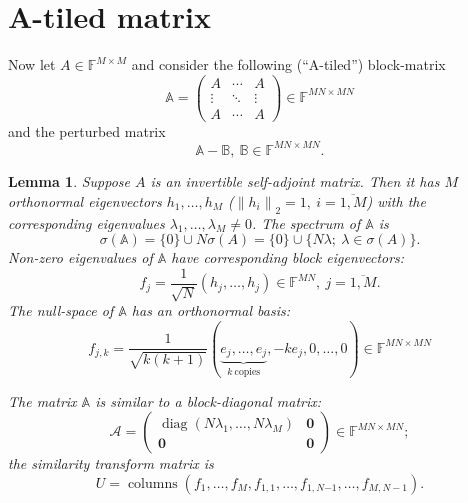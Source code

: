 \documentclass[14pt,a4paper]{extarticle}
\newtheorem{lem}{Lemma}
\theoremstyle{definition}
\begin{document}
\section{A-tiled matrix}

Now let \( A\in\mathbb{F}^{M{\times}M} \)
    and consider the following (``A-tiled'') block-matrix
    \[
        \mathbb{A} =
        \begin{pmatrix}
            A & \cdots & A \\
            \vdots & \ddots & \vdots \\
            A & \cdots & A
        \end{pmatrix}
        \in\mathbb{F}^{{MN}{\times}{MN}}
    \]
    and the perturbed matrix
    \[
        \mathbb{A} - \mathbb{B},\ \mathbb{B}\in\mathbb{F}^{{MN}{\times}{MN}}.
    \]

\begin{lem}
    Suppose \( A \) is an invertible self-adjoint matrix.
    Then it has \( M \) orthonormal eigenvectors \( h_1, \ldots, h_M \)
    (\(\left\|h_i\right\|_2 = 1,\ i{=}\overline{1,M}\))
    with the corresponding eigenvalues
    \( \lambda_1, \ldots, \lambda_M \neq 0\).
    The spectrum of \( \mathbb{A} \) is
    \[
        \sigma(\mathbb{A}) = \{0\}\cup N\sigma(A) = \{0\} \cup \{N\lambda;\ \lambda\in\sigma(A) \}.
    \]
    Non-zero eigenvalues of \( \mathbb{A} \)
        have corresponding block eigenvectors:
    \[
        f_j = \frac{1}{\sqrt{N}} (h_j, \ldots, h_j)\in \mathbb{F}^{MN},\ j=\overline{1,M}.
    \]
    The null-space of \( \mathbb{A} \)
        has an orthonormal basis:
    \[
        f_{j,k} = \frac{1}{\sqrt{k(k+1)}}
        (
        \underbrace{e_j, \ldots, e_j}_{k\ \text{copies}},
        -ke_j,
        0, \ldots, 0
        ) \in\mathbb{F}^{{MN}{\times}{MN}}
    \]

    The matrix \( \mathbb{A} \) is similar to a block-diagonal matrix:
    \[
        \mathcal{A} =
        \left(\begin{array}{c|c}
            \operatorname{diag}(N\lambda_1,\ldots,N\lambda_M) & \mathbf{0} \\ \hline
            \mathbf{0} & \mathbf{0}
        \end{array}\right)\in\mathbb{F}^{{MN}{\times}{MN}};
    \]
    the similarity transform matrix is
    \[
        U = \operatorname{columns}
        \left(f_1, \ldots, f_M, f_{1,1}, \ldots, f_{1,N{-1}}, \ldots, f_{M,N{-}1}\right).
    \]
\end{lem}
\end{document}

